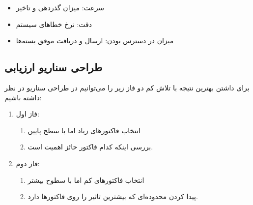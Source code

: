 \begin{itemize}
    \item سرعت: میزان گذردهی و تاخیر
    \item دقت: نرخ خطا‌های سیستم
    \item میزان در دسترس بودن: ارسال و دریافت موفق بسته‌ها
\end{itemize}

\subsection{طراحی سناریو ارزیابی}

برای داشتن بهترین نتیجه با تلاش کم دو فاز زیر را می‌توانیم در طراحی سناریو در
نظر داشته باشیم:

\begin{enumerate}
    \item فاز اول:
    \begin{enumerate}
        \item انتخاب فاکتور‌های زیاد اما با سطح پایین
        \item بررسی اینکه کدام فاکتور حائز اهمیت است.
    \end{enumerate}
    \item فاز دوم:
    \begin{enumerate}
        \item انتخاب فاکتور‌های کم اما با سطوح بیشتر
        \item پیدا کردن محدوده‌ای که بیشترین تاثیر را روی فاکتور‌ها دارد.
    \end{enumerate}
\end{enumerate}
